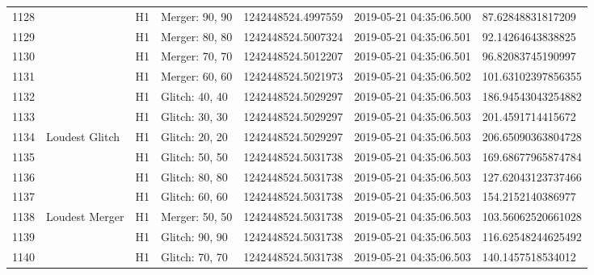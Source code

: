 \begin{longtable}{lllllll}
1128 &                                                    &       H1 &    Merger: 90, 90 &  1242448524.4997559 &  2019-05-21 04:35:06.500 &   87.62848831817209 \\
1129 &                                                    &       H1 &    Merger: 80, 80 &  1242448524.5007324 &  2019-05-21 04:35:06.501 &   92.14264643838825 \\
1130 &                                                    &       H1 &    Merger: 70, 70 &  1242448524.5012207 &  2019-05-21 04:35:06.501 &   96.82083745190997 \\
1131 &                                                    &       H1 &    Merger: 60, 60 &  1242448524.5021973 &  2019-05-21 04:35:06.502 &  101.63102397856355 \\
1132 &                                                    &       H1 &    Glitch: 40, 40 &  1242448524.5029297 &  2019-05-21 04:35:06.503 &  186.94543043254882 \\
1133 &                                                    &       H1 &    Glitch: 30, 30 &  1242448524.5029297 &  2019-05-21 04:35:06.503 &   201.4591714415672 \\
1134 &                                     Loudest Glitch &       H1 &    Glitch: 20, 20 &  1242448524.5029297 &  2019-05-21 04:35:06.503 &  206.65090363804728 \\
1135 &                                                    &       H1 &    Glitch: 50, 50 &  1242448524.5031738 &  2019-05-21 04:35:06.503 &  169.68677965874784 \\
1136 &                                                    &       H1 &    Glitch: 80, 80 &  1242448524.5031738 &  2019-05-21 04:35:06.503 &  127.62043123737466 \\
1137 &                                                    &       H1 &    Glitch: 60, 60 &  1242448524.5031738 &  2019-05-21 04:35:06.503 &   154.2152140386977 \\
1138 &                                     Loudest Merger &       H1 &    Merger: 50, 50 &  1242448524.5031738 &  2019-05-21 04:35:06.503 &  103.56062520661028 \\
1139 &                                                    &       H1 &    Glitch: 90, 90 &  1242448524.5031738 &  2019-05-21 04:35:06.503 &  116.62548244625492 \\
1140 &                                                    &       H1 &    Glitch: 70, 70 &  1242448524.5031738 &  2019-05-21 04:35:06.503 &   140.1457518534012 \\

\end{longtable}

